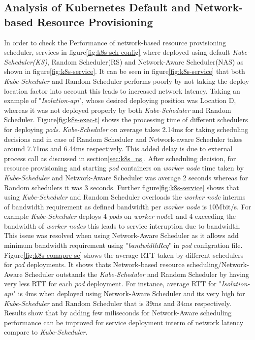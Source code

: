 \subsection{Analysis of Kubernetes Default and Network-based Resource Provisioning}
\label{sec:analysis}
In order to check the Performance of network-based resource provisioning scheduler, services in figure\ref{fig:k8s-sch-config} where deployed using default \emph{Kube-Scheduler(KS)}, Random Scheduler(RS) and Network-Aware Scheduler(NAS) as shown in figure\ref{fig:k8s-service}. It can be seen in figure\ref{fig:k8s-service} that both \emph{Kube-Scheduler} and Random Scheduler performs poorly by not taking the deploy location factor into account this leads to increased network latency\cite{Santos2019}. Taking an example of "\emph{Isolation-api}", whose desired deploying position was Location D, whereas it was not deployed properly by both \emph{Kube-Scheduler} and Random Scheduler\cite{Santos2019}. Figure\ref{fig:k8s-exec-t} shows the processing time of different schedulers for deploying \emph{pods}. \emph{Kube-Scheduler} on average takes 2.14ms for taking scheduling decisions and in case of Random Scheduler and Network-aware Scheduler takes around 7.71ms and 6.44ms respectively\cite{Santos2019}. This added delay is due to external process call as discussed in section\ref{sec:k8s_ns}. After scheduling decision, for resource provisioning and starting \emph{pod} containers on \emph{worker node} time taken by \emph{Kube-Scheduler} and Network-Aware Scheduler was average 2 seconds whereas for Random schedulers it was 3 seconds\cite{Santos2019}. Further figure\ref{fig:k8s-service} shows that using \emph{Kube-Scheduler} and Random Scheduler overloads the \emph{worker node} interms of bandwidth requirement as defined bandwidth per \emph{worker node} is 10Mbit/s\cite{Santos2019}. For example \emph{Kube-Scheduler} deploys 4 \emph{pods} on \emph{worker node}1 and 4 exceeding the bandwidth of \emph{worker nodes} this leads to service interuption due to bandwidth\cite{Santos2019}. This issue was resolved when using Network-Aware Scheduler as it allows add minimum bandwidth requirement using "\emph{bandwidthReq}" in \emph{pod} configration file. Figure\ref{fig:k8s-comapre-sc} shows the average RTT taken by different schedulers for \emph{pod} deployments. It shows thats Network-based resource scheduling/Network-Aware Scheduler outstands the \emph{Kube-Scheduler} and Random Scheduler by having very less RTT for each \emph{pod} deployment\cite{Santos2019}. For instance, average RTT for "\emph{Isolation-api}" is 4ms when deployed using Network-Aware Scheduler and its very high for \emph{Kube-Scheduler} and Random Scheduler that is 39ms and 34ms respectively\cite{Santos2019}. Results show that by adding few miliseconds for Network-Aware scheduling performance can be improved for service deployment interm of network latency compare to \emph{Kube-Scheduler}\cite{Santos2019}.
